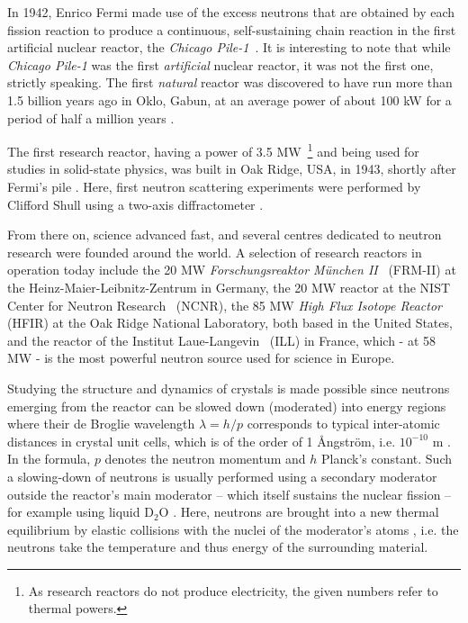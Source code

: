 In 1942, Enrico Fermi made use of the excess neutrons that are obtained by each fission reaction to produce a continuous, self-sustaining chain reaction in the first artificial nuclear reactor, the \textit{Chicago Pile-1}~\cite[p.1]{Jacrot2021}.
It is interesting to note that while \textit{Chicago Pile-1} was the first \textit{artificial} nuclear reactor, it was not the first one, strictly speaking. The first \textit{natural} reactor was discovered to have run more than 1.5 billion years ago in Oklo, Gabun, at an average power of about 100 kW for a period of half a million years \cite{wiki_oklo}.

The first research reactor, having a power of 3.5 MW~\footnote{As research reactors do not produce electricity, the given numbers refer to thermal powers.} and being used for studies in solid-state physics, was built in Oak Ridge, USA, in 1943, shortly after Fermi's pile \cite[p. 3]{Jacrot2021}.
Here, first neutron scattering experiments were performed by Clifford Shull using a two-axis diffractometer \cite[pp. 3, 37]{Jacrot2021}.

From there on, science advanced fast, and several centres dedicated to neutron research were founded around the world.
A selection of research reactors in operation today include the 20 MW \textit{Forschungsreaktor M\"unchen II}~\cite{web_mlz} (FRM-II) at the Heinz-Maier-Leibnitz-Zentrum in Germany, the 20 MW reactor at the NIST Center for Neutron Research~\cite{web_nist} (NCNR), the 85 MW \textit{High Flux Isotope Reactor}~\cite{web_oakridge} (HFIR) at the Oak Ridge National Laboratory, both based in the United States, and the reactor of the Institut Laue-Langevin~\cite{web_ill} (ILL) in France, which - at 58 MW - is the most powerful neutron source used for science in Europe.

Studying the structure and dynamics of crystals is made possible since neutrons emerging from the reactor can be slowed down (moderated) into energy regions where their de Broglie wavelength $\lambda = h/p$ \cite[p. 89]{Gross2012} corresponds to typical inter-atomic distances in crystal unit cells, which is of the order of 1 \AA{}ngstr\"om, i.e. $10^{-10}$ m \cite[pp.1,3]{Squires2012}. In the formula, $p$ denotes the neutron momentum and $h$ Planck's constant. Such a slowing-down of neutrons is usually performed using a secondary moderator outside the reactor's main moderator -- which itself sustains the nuclear fission -- for example using liquid $\mathrm{D_2O}$ \cite[p. 82]{Jacrot2021}. Here, neutrons are brought into a new thermal equilibrium by elastic collisions with the nuclei of the moderator's atoms \cite[p. 30]{Stacey2007}, i.e. the neutrons take the temperature and thus energy of the surrounding material.



